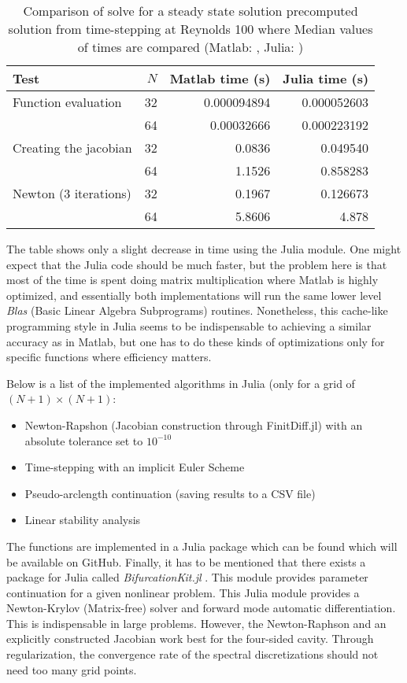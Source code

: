 \begin{table}[h]
  \caption{Comparison of solve for a steady state solution precomputed solution 
    from time-stepping at Reynolds 100 where Median values of times are compared
  (Matlab: , Julia: )}
  \label{tab:matlab_julia}
\begin{tabular}{lrrr}
Test & $N$ & Matlab time (s) & Julia time (s) \\
\hline
Function evaluation  & 32 & 0.000094894  & 0.000052603 \\
& 64 & 0.00032666 & 0.000223192 \\
 Creating the jacobian  & 32 & 0.0836  &  0.049540  \\
& 64 & 1.1526 & 0.858283 \\
Newton (3 iterations)  & 32 & 0.1967  & 0.126673 \\
& 64 & 5.8606  & 4.878 \\
\end{tabular}
\end{table}

The table shows only a slight decrease in time using the Julia module. One
might expect that the Julia code should be much faster, but the problem here is
that most of the time is spent doing matrix multiplication where Matlab is
highly optimized, and essentially both implementations will run the same lower
level \emph{Blas} (Basic Linear Algebra Subprograms) routines. Nonetheless,
this cache-like programming style in Julia seems to be indispensable to
achieving a similar accuracy as in Matlab, but one has to do these kinds of
optimizations only for specific functions where efficiency matters.

Below is a list of the implemented algorithms in Julia (only for a grid of
$(N+1) \times (N+1)$:

\begin{itemize}
\item Newton-Rapshon (Jacobian construction through FinitDiff.jl) with an absolute tolerance
  set to $10^{-10}$
\item Time-stepping with an implicit Euler Scheme
\item Pseudo-arclength continuation (saving results to a CSV file)
\item Linear stability analysis
\end{itemize}

The functions are implemented in a Julia package which can be found which will
be available on GitHub. Finally, it has to be mentioned that there exists a
package for Julia called \emph{BifurcationKit.jl} \citep{veltz2020}. This
module provides parameter continuation for a given nonlinear problem. This
Julia module provides a Newton-Krylov (Matrix-free) solver and forward mode
automatic differentiation. This is indispensable in large problems. However,
the Newton-Raphson and an explicitly constructed Jacobian work best for the
four-sided cavity. Through regularization, the convergence rate of the spectral
discretizations should not need too many grid points.
